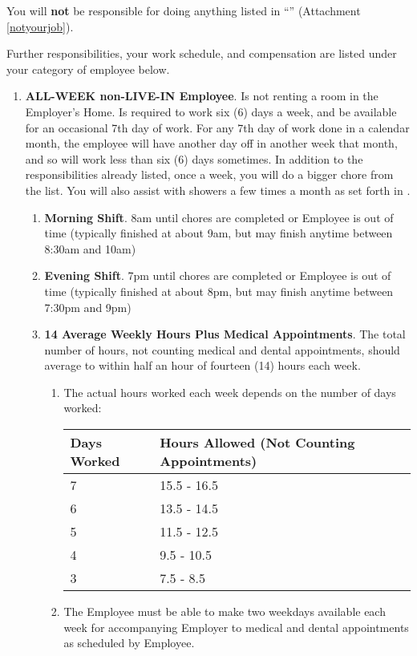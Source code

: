 \documentclass[]{article}
\newcommand{\mw}{.29\textwidth}
\newcommand{\allweek}{ALL-WEEK non-LIVE-IN Employee}
\begin{document}
You will \textbf{not} be responsible for doing anything listed in ``\notyourjob{}'' (Attachment \ref{notyourjob}). 

Further responsibilities, your work schedule, and compensation are listed under your category of employee below.
\begin{enumerate}
	\item \textbf{\allweek{}}. \label{allweek}
		Is not renting a room in the Employer's Home. Is required to work six (6) days a week, and be available for an occasional 7th day of work. For any 7th day of work done in a calendar month, the employee will have another day off in another week that month, and so will work less than six (6) days sometimes. In addition to the responsibilities already listed, once a week, you will do a bigger chore from the \bigchores{} list. You will also assist with showers a few times a month as set forth in \shower{}. 
		\begin{enumerate}
			\item \textbf{Morning Shift}. 8am until chores are completed or Employee is out of time (typically finished at about 9am, but may finish anytime between 8:30am and 10am)
			\item \textbf{Evening Shift}. 7pm until chores are completed or Employee is out of time (typically finished at about 8pm, but may finish anytime between 7:30pm and 9pm)
			\item \textbf{14 Average Weekly Hours Plus Medical Appointments}. The total number of hours, not counting medical and dental appointments, should average to within half an hour of fourteen (14) hours each week. 
				\begin{enumerate}
					\item The actual hours worked each week depends on the number of days worked:
						\begin{tabular}{|p{\mw}|p{\mw}|}
							\hline
							\rowcolor{medgray}
							Days Worked & Hours Allowed (Not Counting Appointments) \\ \hline
							7 & 15.5 - 16.5 \\ \hline
							6 & 13.5 - 14.5 \\ \hline
							5 & 11.5 - 12.5 \\ \hline
							4 & 9.5 - 10.5 \\ \hline
							3 & 7.5 - 8.5 \\
							\hline
						\end{tabular}
					\item The Employee must be able to make two weekdays available each week for accompanying Employer to medical and dental appointments as scheduled by Employee.

\end{enumerate}
\end{enumerate}
\end{enumerate}
\end{document}

